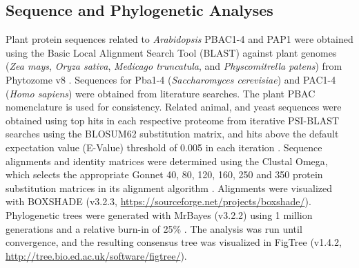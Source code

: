 \subsection{Sequence and Phylogenetic Analyses}
Plant protein sequences related to \textit{Arabidopsis} PBAC1-4 and PAP1 were obtained using the Basic Local Alignment Search Tool (BLAST) against plant genomes (\textit{Zea mays}, \textit{Oryza sativa}, \textit{Medicago truncatula}, and \textit{Physcomitrella patens}) from Phytozome v8 \citep{goodstein12}. Sequences for Pba1-4 (\textit{Saccharomyces cerevisiae}) and PAC1-4 (\textit{Homo sapiens}) were obtained from literature searches. The plant PBAC nomenclature is used for consistency. Related animal, and yeast sequences were obtained using top hits in each respective proteome from iterative PSI-BLAST searches using the BLOSUM62 substitution matrix, and hits above the default expectation value (E-Value) threshold of 0.005 in each iteration \citep{altschul97}. Sequence alignments and identity matrices were determined using the Clustal Omega, which selects the appropriate Gonnet 40, 80, 120, 160, 250 and 350 protein substitution matrices in its alignment algorithm \citep{gonnet92, sievers14, sievers11}. Alignments were visualized with BOXSHADE (v3.2.3, \url{https://sourceforge.net/projects/boxshade/}). Phylogenetic trees were generated with MrBayes (v3.2.2) using 1 million generations and a relative burn-in of 25\% \citep{ronquist12}. The analysis was run until convergence, and the resulting consensus tree was visualized in FigTree (v1.4.2, \url{http://tree.bio.ed.ac.uk/software/figtree/}).
 
